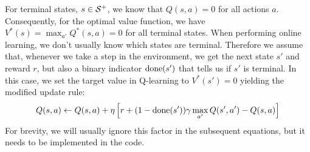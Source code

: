 


For terminal states, $s \in \mathcal{S}^+$, we know that
$Q(s,a)=0$ for all actions $a$.
Consequently, for the optimal value function,
we have
$V^*(s) = \max_{a'} Q^*(s,a)=0$
for all terminal states.
%
When  performing online learning, we don't usually know
which states are terminal.
Therefore we assume that, whenever we take a step in the environment,
we get the next state $s'$ and reward $r$,
but also a binary indicator $\text{done}(s')$ that tells us
if $s'$ is terminal.
In this case,  we set the target value in Q-learning
to $V^*(s')=0$ yielding the modified update rule:
\begin{align}
Q(s,a) \leftarrow Q(s,a) + \eta \left[
  r + (1-\text{done}(s')) \gamma \max_{a'} Q(s',a') - Q(s,a) \right]
\label{eqn:Qlearningdone}
\end{align}
For brevity, we will usually ignore this factor in the subsequent equations,
but it needs to be implemented in the code.



